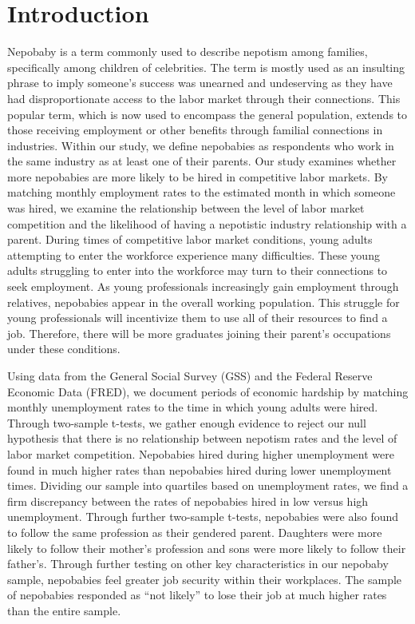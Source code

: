 \documentclass[12pt]{article}
\begin{document}
\section{Introduction} \label{sec:introduction}
Nepobaby is a term commonly used to describe nepotism among families, specifically among children of celebrities. The term is mostly used as an insulting phrase to imply someone's success was unearned and undeserving as they have had disproportionate access to the labor market through their connections. This popular term, which is now used to encompass the general population, extends to those receiving employment or other benefits through familial connections in industries. Within our study, we define nepobabies as respondents who work in the same industry as at least one of their parents.
Our study examines whether more nepobabies are more likely to be hired in competitive labor markets. By matching monthly employment rates to the estimated month in which someone was hired, we examine the relationship between the level of labor market competition and the likelihood of having a nepotistic industry relationship with a parent.
During times of competitive labor market conditions, young adults attempting to enter the workforce experience many difficulties. These young adults struggling to enter into the workforce may turn to their connections to seek employment. As young professionals increasingly gain employment through relatives, nepobabies appear in the overall working population. This struggle for young professionals will incentivize them to use all of their resources to find a job. Therefore, there will be more graduates joining their parent’s occupations under these conditions. 


Using data from the General Social Survey (GSS) and the Federal Reserve Economic Data (FRED), we document periods of economic hardship by matching monthly unemployment rates to the time in which young adults were hired. Through two-sample t-tests, we gather enough evidence to reject our null hypothesis that there is no relationship between nepotism rates and the level of labor market competition. Nepobabies hired during higher unemployment were found in much higher rates than nepobabies hired during lower unemployment times. Dividing our sample into  quartiles based on unemployment rates, we find a firm discrepancy between the rates of nepobabies hired in low versus high unemployment. Through further two-sample t-tests, nepobabies were also found to follow the same profession as their gendered parent. Daughters were more likely to follow their mother's profession and sons were more likely to follow their father's. Through further testing on other key characteristics in our nepobaby sample, nepobabies feel greater job security within their workplaces. The sample of nepobabies responded as “not likely” to lose their job at much higher rates than the entire sample. 
\end{document}
